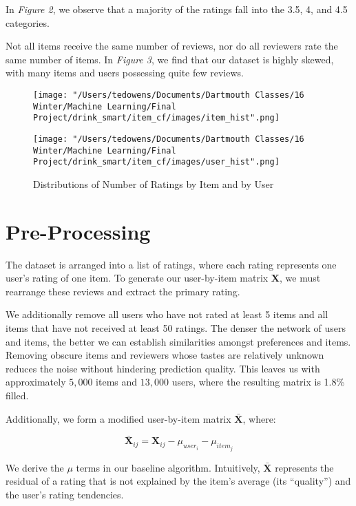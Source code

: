 \documentclass[12pt]{article}
\begin{document}
In \textit{Figure 2}, we observe that a majority of the ratings fall into the 3.5, 4, and 4.5 categories.

Not all items receive the same number of reviews, nor do all reviewers rate the same number of items. In \textit{Figure 3}, we find that our dataset is highly skewed, with many items and users possessing quite few reviews.

\begin{figure}[!ht]
\caption{Distributions of Number of Ratings by Item and by User}
\centering
\begin{minipage}{.5\textwidth}
  \centering
  \texttt{[image: "/Users/tedowens/Documents/Dartmouth Classes/16 Winter/Machine Learning/Final Project/drink\_smart/item\_cf/images/item\_hist".png]}
\end{minipage}%
\begin{minipage}{.5\textwidth}
  \centering
  \texttt{[image: "/Users/tedowens/Documents/Dartmouth Classes/16 Winter/Machine Learning/Final Project/drink\_smart/item\_cf/images/user\_hist".png]}
\end{minipage}
\end{figure}

\section{Pre-Processing}
The dataset is arranged into a list of ratings, where each rating represents one user's rating of one item. To generate our user-by-item matrix $\mathbf{X}$, we must rearrange these reviews and extract the primary rating.

We additionally remove all users who have not rated at least 5 items and all items that have not received at least 50 ratings. The denser the network of users and items, the better we can establish similarities amongst preferences and items. Removing obscure items and reviewers whose tastes are relatively unknown reduces the noise without hindering prediction quality. This leaves us with approximately $5,000$ items and $13,000$ users, where the resulting matrix is 1.8\% filled.

Additionally, we form a modified user-by-item matrix $\mathbf{\bar X}$, where:

$$ \mathbf{\bar X}_{ij} = \mathbf{X}_{ij} - \mu_{user_i} - \mu_{item_j}$$

We derive the $\mu$ terms in our baseline algorithm. Intuitively, $\mathbf{\bar X}$ represents the residual of a rating that is not explained by the item's average (its ``quality'') and the user's rating tendencies.
\end{document}
